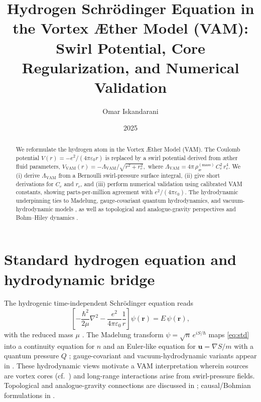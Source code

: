 \documentclass[12pt]{article}
\title{Hydrogen Schr\"odinger Equation in the Vortex \AE ther Model (VAM):\\
Swirl Potential, Core Regularization, and Numerical Validation}
\author{Omar Iskandarani}
\date{2025}
\newcommand{\aeRhoM}{\rho_{\text{\ae}}^{(\text{mass})}}
\newcommand{\Ce}{C_e}
\newcommand{\rc}{r_c}
\newcommand{\Lam}{\Lambda_{\text{VAM}}}
\begin{document}
    \maketitle

    \begin{abstract}
        We reformulate the hydrogen atom in the Vortex \AE{}ther Model (VAM). The Coulomb potential
        \(
        V(r)=-e^2/(4\pi\varepsilon_0 r)
        \)
        is replaced by a swirl potential derived from æther fluid parameters,
        \(
        V_{\text{VAM}}(r) = -\Lam/\sqrt{r^2+\rc^2},
        \)
        where
        \(
        \Lam = 4\pi\,\aeRhoM\,\Ce^2\,\rc^4.
        \)
        We (i) derive \(\Lam\) from a Bernoulli swirl-pressure surface integral, (ii) give short derivations for \(\Ce\) and \(\rc\), and (iii) perform numerical validation using calibrated VAM constants, showing parts-per-million agreement with \(e^2/(4\pi\varepsilon_0)\). The hydrodynamic underpinning ties to Madelung, gauge-covariant quantum hydrodynamics, and vacuum-hydrodynamic models \cite{Madelung1927,Pati2000,Sbitnev2015}, as well as topological and analogue-gravity perspectives \cite{Kiehn2002,Ranada1995,Barcelo2011} and Bohm--Hiley dynamics \cite{Bohm1952,Hiley2012}.
    \end{abstract}

    \section{Standard hydrogen equation and hydrodynamic bridge}
    The hydrogenic time-independent Schrödinger equation reads
    \begin{equation}
        \label{eq:std}
        \left[-\frac{\hbar^2}{2\mu}\nabla^2 - \frac{e^2}{4\pi\varepsilon_0}\frac{1}{r}\right]\psi(\mathbf{r})=E\,\psi(\mathbf{r}),
    \end{equation}
    with the reduced mass \(\mu\) \cite{Schrodinger1926a,BetheSalpeter1957}.
    The Madelung transform \(\psi=\sqrt{n}\,e^{iS/\hbar}\) maps \eqref{eq:std} into a continuity equation for \(n\) and an Euler-like equation for \(\mathbf{u}=\nabla S/m\) with a quantum pressure \(Q\) \cite{Madelung1927}; gauge-covariant and vacuum-hydrodynamic variants appear in \cite{Pati2000,Sbitnev2015}. These hydrodynamic views motivate a VAM interpretation wherein sources are vortex cores (cf.\ \cite{Helmholtz1858,Kelvin1867}) and long-range interactions arise from swirl-pressure fields. Topological and analogue-gravity connections are discussed in \cite{Ranada1995,Kiehn2002,Barcelo2011}; causal/Bohmian formulations in \cite{Bohm1952,Hiley2012}.
\end{document}

